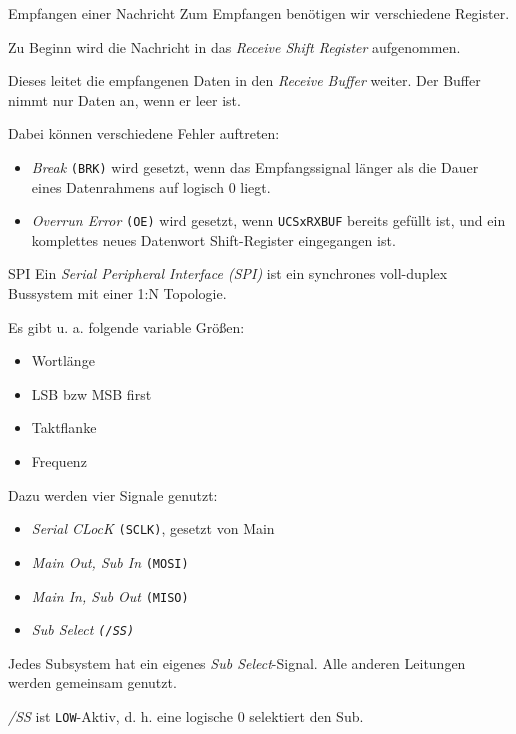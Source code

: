 \begin{bonus}{Empfangen einer Nachricht}
    Zum Empfangen benötigen wir verschiedene Register.

    Zu Beginn wird die Nachricht in das \emph{Receive Shift Register} aufgenommen.

    Dieses leitet die empfangenen Daten in den \emph{Receive Buffer} weiter.
    Der Buffer nimmt nur Daten an, wenn er leer ist.

    Dabei können verschiedene Fehler auftreten:
    \begin{itemize}
        \item \emph{Break} \texttt{(BRK)} wird gesetzt, wenn das Empfangssignal länger als die Dauer eines Datenrahmens auf logisch 0 liegt.
        \item \emph{Overrun Error} \texttt{(OE)} wird gesetzt, wenn \texttt{UCSxRXBUF} bereits gefüllt ist, und ein komplettes neues Datenwort Shift-Register eingegangen ist.
    \end{itemize}
\end{bonus}

\begin{defi}{SPI}
    Ein \emph{Serial Peripheral Interface (SPI)} ist ein synchrones voll-duplex Bussystem mit einer 1:N Topologie.

    Es gibt u. a. folgende variable Größen:
    \begin{itemize}
        \item Wortlänge
        \item LSB bzw MSB first
        \item Taktflanke
        \item Frequenz
    \end{itemize}

    Dazu werden vier Signale genutzt:
    \begin{itemize}
        \item \emph{Serial CLocK} \texttt{(SCLK)}, gesetzt von Main
        \item \emph{Main Out, Sub In} \texttt{(MOSI)}
        \item \emph{Main In, Sub Out} \texttt{(MISO)}
        \item \emph{Sub Select \texttt{(/SS)}}
    \end{itemize}

    Jedes Subsystem hat ein eigenes \emph{Sub Select}-Signal.
    Alle anderen Leitungen werden gemeinsam genutzt.

    \emph{/SS} ist \texttt{LOW}-Aktiv, d. h. eine logische 0 selektiert den Sub.
\end{defi}

